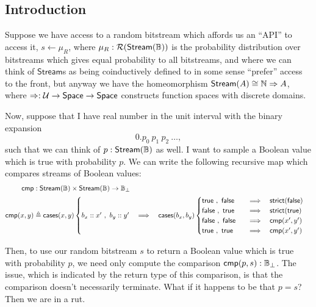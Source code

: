 \newcommand{\Stream}{\mathsf{Stream}}
\newcommand{\Prob}{\mathcal{R}}

\subsection{Introduction}

Suppose we have access to a random bitstream which affords us an ``API'' to access it, $s \leftarrow \mu_R$, where $\mu_R : \Prob(\Stream(\bool))$ is the probability distribution over bitstreams which gives equal probability to all bitstreams, and where we can think of $\Stream$s as being coinductively defined to in some sense ``prefer'' access to the front, but anyway we have the homeomorphism $\Stream(A) \cong \nat \Rightarrow A$, where $\Rightarrow : \mathcal{U} \to \mathsf{Space} \to \mathsf{Space}$ constructs function spaces with discrete domains.

Now, suppose that I have real number in the unit interval with the binary expansion
\[
0. p_0\ p_1\ p_2\ \ldots,
\]
such that we can think of $p : \Stream(\bool)$ as well. I want to sample a Boolean value which is true with probability $p$. We can write the following recursive map which compares streams of Boolean values:
\begin{align*}
\mathsf{cmp} &: \Stream(\bool) \times \Stream(\bool) \to \bool_\bot
\\ \mathsf{cmp}(x, y) &\triangleq \mathsf{cases}(x, y)
\begin{cases}
b_x :: x'\ ,\ b_y :: y'
\quad \Longrightarrow \quad
\mathsf{cases}(b_x, b_y)
  \begin{cases}
  \mathsf{true}\ ,\ \mathsf{false} \quad &\Longrightarrow \quad
    \mathsf{strict}(\mathsf{false})
    \\
    \mathsf{false}\ ,\ \mathsf{true} \quad &\Longrightarrow \quad
    \mathsf{strict}(\mathsf{true})
    \\
    \mathsf{false}\ ,\ \mathsf{false} \quad &\Longrightarrow \quad
    \mathsf{cmp}(x', y')
    \\
    \mathsf{true}\ ,\ \mathsf{true} \quad &\Longrightarrow \quad
    \mathsf{cmp}(x', y')
  \end{cases}
\end{cases}
\end{align*}

Then, to use our random bitstream $s$ to return a Boolean value which is true with probability $p$, we need only compute the comparison $\mathsf{cmp}(p, s) : \mathbb{B}_\bot$. The issue, which is indicated by the return type of this comparison, is that the comparison doesn't necessarily terminate. What if it happens to be that $p = s$? Then we are in a rut.

